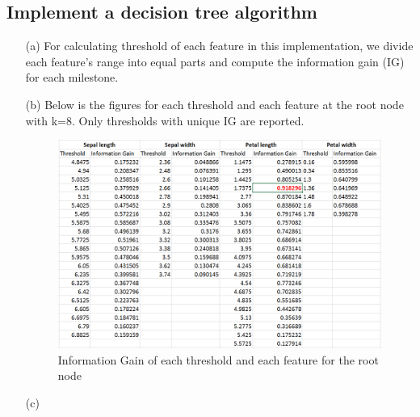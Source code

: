 \documentclass[a4paper]{article}
\begin{document}
\subsection{Implement a decision tree algorithm}
\begin{enumerate}
\item[(a)] For calculating threshold of each feature in this implementation, we divide each feature's range into equal parts and compute the information gain (IG) for each milestone. %
\item[(b)] Below is the figures for each threshold and each feature at the root node with k=8. Only thresholds with unique IG are reported.

\begin{figure}[H]
\begin{center}
\includegraphics[width=5in]{thresholds.png}
\caption{Information Gain of each threshold and each feature for the root node}
\end{center}
\end{figure}


\item[(c)]



\end{enumerate}
\end{document}
